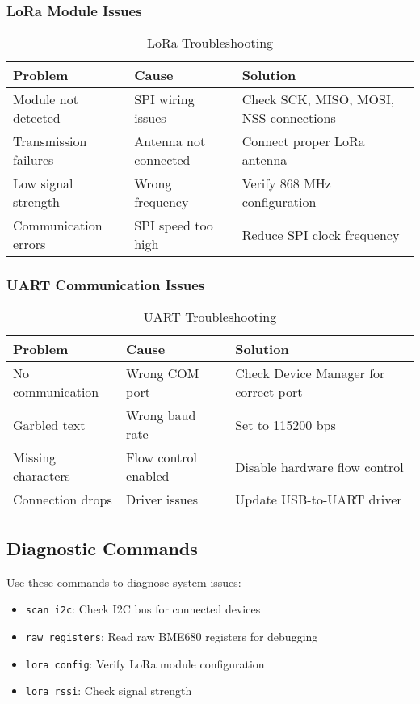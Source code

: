 \documentclass[11pt,a4paper]{article}
\newcommand{\command}[1]{\texttt{#1}}
\begin{document}
\subsubsection{LoRa Module Issues}
\begin{table}[h]
\centering
\begin{tabular}{|l|l|l|}
\hline
\textbf{Problem} & \textbf{Cause} & \textbf{Solution} \\
\hline
Module not detected & SPI wiring issues & Check SCK, MISO, MOSI, NSS connections \\
\hline
Transmission failures & Antenna not connected & Connect proper LoRa antenna \\
\hline
Low signal strength & Wrong frequency & Verify 868 MHz configuration \\
\hline
Communication errors & SPI speed too high & Reduce SPI clock frequency \\
\hline
\end{tabular}
\caption{LoRa Troubleshooting}
\end{table}

\subsubsection{UART Communication Issues}
\begin{table}[h]
\centering
\begin{tabular}{|l|l|l|}
\hline
\textbf{Problem} & \textbf{Cause} & \textbf{Solution} \\
\hline
No communication & Wrong COM port & Check Device Manager for correct port \\
\hline
Garbled text & Wrong baud rate & Set to 115200 bps \\
\hline
Missing characters & Flow control enabled & Disable hardware flow control \\
\hline
Connection drops & Driver issues & Update USB-to-UART driver \\
\hline
\end{tabular}
\caption{UART Troubleshooting}
\end{table}

\subsection{Diagnostic Commands}
Use these commands to diagnose system issues:

\begin{itemize}
    \item \command{scan i2c}: Check I2C bus for connected devices
    \item \command{raw registers}: Read raw BME680 registers for debugging
    \item \command{lora config}: Verify LoRa module configuration
    \item \command{lora rssi}: Check signal strength
\end{itemize}
\end{document}
